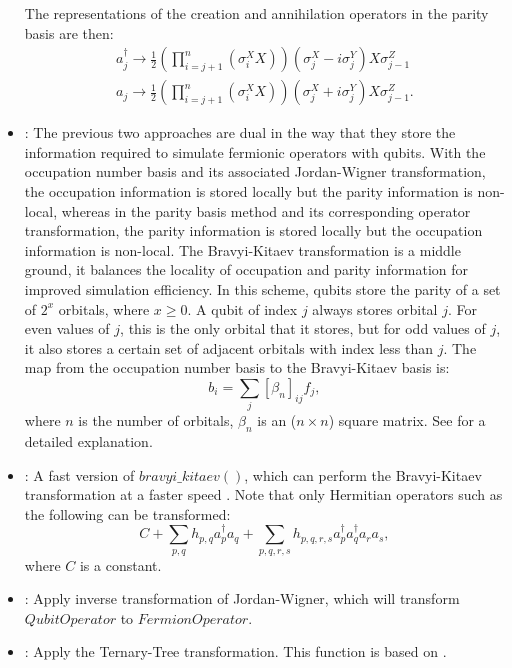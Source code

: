 \begin{itemize}
          The representations of the creation and annihilation operators in the parity basis are then:
          \begin{equation}
              \begin{split}
                  a_j^{\dagger} \to \frac{1}{2} (\prod_{i=j+1}^n ({\sigma}^X_i X))({\sigma}^X_j - i{\sigma}^Y_j) X {\sigma}^Z_{j-1} \\
                  a_j \to \frac{1}{2} (\prod_{i=j+1}^n ({\sigma}^X_i X))({\sigma}^X_j + i{\sigma}^Y_j) X {\sigma}^Z_{j-1}.
              \end{split}
          \end{equation}
    \item \methodbravyikitaev \cite{bravyi2002fermionic, fenwick1994new}: The previous two approaches are dual in the way that they store the information required to simulate fermionic operators with qubits. With the occupation number basis and its associated Jordan-Wigner transformation, the occupation information is stored locally but the parity information is non-local, whereas in the parity basis method and its corresponding operator transformation, the parity information is stored locally but the occupation information is non-local.
          The Bravyi-Kitaev transformation is a middle ground, it balances the locality of occupation and parity information for improved simulation efficiency. In this scheme, qubits store the parity of a set of $2^x$ orbitals, where $x \geq 0$. A qubit of index $j$ always stores orbital $j$. For even values of $j$, this is the only orbital that it stores, but for odd values of $j$, it also stores a certain set of adjacent orbitals with index less than $j$. The map from the occupation number basis to the Bravyi-Kitaev basis is:
          \begin{equation}
              b_i = \sum_j {[\beta_n]_{ij} f_j},
          \end{equation}
          where $n$ is the number of orbitals, $\beta_n$ is an ($n \times n$) square matrix. See \cite{seeley2012bravyi} for a detailed explanation.
    \item \methodbravyikitaevsuperfast: A fast version of $bravyi\_kitaev()$, which can perform the Bravyi-Kitaev transformation at a faster speed \cite{setia2018bravyi}. Note that only Hermitian operators such as the following can be transformed:
          \begin{equation}
              C + \sum_{p,q} h_{p,q} a_p^{\dagger} a_q + \sum_{p,q,r,s} h_{p,q,r,s} a_p^{\dagger} a_q^{\dagger} a_r a_s,
          \end{equation}
          where $C$ is a constant.
    \item \methodreversedjordanwigner: Apply inverse transformation of Jordan-Wigner, which will transform $QubitOperator$ to $FermionOperator$.
    \item \methodternarytree: Apply the Ternary-Tree transformation. This function is based on \cite{jiang2020optimal}.
\end{itemize}
